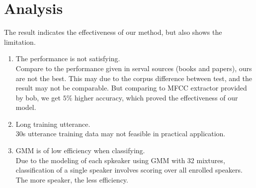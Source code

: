\section{Analysis}
	The result indicates the effectiveness of our method, but also shows the limitation.
	\begin{enumerate}
		\item The performance is not satisfying. \\
			Compare to the performance given in serval sources (books and papers),
			ours are not the best.  This may due to the corpus difference between
			test, and the result may not be comparable.
			But comparing to MFCC extractor provided by
			bob\cite{bob2012}, we get $5\%$ higher accuracy, which proved the
			effectiveness of our model.
		\item Long training utterance. \\
			30s utterance training data may not feasible in practical application.
		\item GMM is of low efficiency when classifying. \\
			Due to the modeling of each spkeaker using GMM with 32 mixtures,
			classification of a single speaker involves scoring over all
			enrolled speakers. The more speaker, the less efficiency.
	\end{enumerate}

